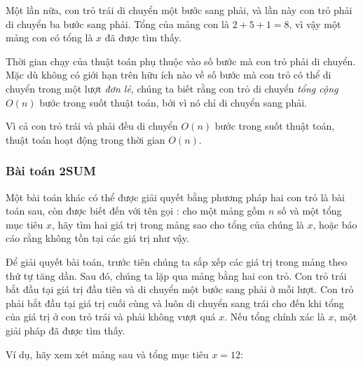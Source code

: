 Một lần nữa, con trỏ trái di chuyển một bước sang phải,
và lần này con trỏ phải di chuyển ba
bước sang phải.
Tổng của mảng con là $2+5+1=8$, vì vậy một mảng con
có tổng là $x$ đã được tìm thấy.

\begin{center}
\end{center}

Thời gian chạy của thuật toán phụ thuộc vào
số bước mà con trỏ phải di chuyển.
Mặc dù không có giới hạn trên hữu ích nào về số bước mà
con trỏ có thể di chuyển trong một lượt \emph{đơn lẻ},
chúng ta biết rằng con trỏ di chuyển \emph{tổng cộng}
$O(n)$ bước trong suốt thuật toán,
bởi vì nó chỉ di chuyển sang phải.

Vì cả con trỏ trái và phải
đều di chuyển $O(n)$ bước trong suốt thuật toán,
thuật toán hoạt động trong thời gian $O(n)$.

\subsubsection{Bài toán 2SUM}


Một bài toán khác có thể được giải quyết bằng
phương pháp hai con trỏ là bài toán sau,
còn được biết đến với tên gọi :
cho một mảng gồm $n$ số và
một tổng mục tiêu $x$, hãy tìm
hai giá trị trong mảng sao cho tổng của chúng là $x$,
hoặc báo cáo rằng không tồn tại các giá trị như vậy.

Để giải quyết bài toán, trước tiên chúng ta
sắp xếp các giá trị trong mảng theo thứ tự tăng dần.
Sau đó, chúng ta lặp qua mảng bằng
hai con trỏ.
Con trỏ trái bắt đầu tại giá trị đầu tiên
và di chuyển một bước sang phải ở mỗi lượt.
Con trỏ phải bắt đầu tại giá trị cuối cùng
và luôn di chuyển sang trái cho đến khi tổng của
giá trị ở con trỏ trái và phải không vượt quá $x$.
Nếu tổng chính xác là $x$,
một giải pháp đã được tìm thấy.

Ví dụ, hãy xem xét mảng sau
và tổng mục tiêu $x=12$:
\begin{center}
\end{center}

